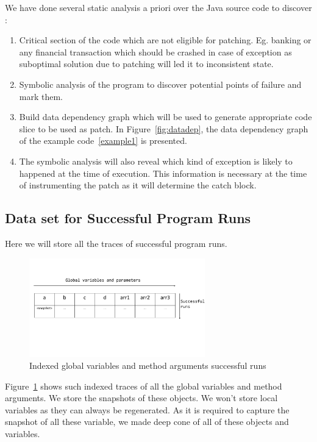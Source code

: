 \documentclass{sigplanconf}
\begin{document}
We have done several  static analysis a priori  over the Java source code to discover :
\begin{enumerate}
	\item Critical section of the code which are not eligible for patching. Eg. banking or any financial transaction which should be crashed in case of exception as suboptimal solution due to patching will led it to inconsistent state.
	\item Symbolic analysis of the program to discover potential points of failure and mark them.
	\item Build data dependency graph which will be used to generate appropriate code slice to be used as patch. In Figure~\ref{fig:datadep}, the data dependency graph of the example code~\ref{example1} is presented.
	\item The symbolic analysis will also reveal which kind of exception is likely to happened at the time of execution. This information is necessary at the time of instrumenting the patch as it will determine the catch block.
	
\end{enumerate}

\subsection{Data set for Successful Program Runs}
\label{subsec:progrun}

Here we will store all the traces of successful program runs.
\begin{figure}[!htb]
\centering
\includegraphics[width=3.0in]{images/succrun.pdf}
\caption{Indexed global variables and method arguments successful runs}
\label{fig:succrun}
\end{figure}

Figure~\ref{fig:succrun} shows such indexed traces of all the global variables and method arguments. We store the snapshots of these objects. We won't store local variables as they can always be regenerated. As it is required to capture the snapshot of all these variable, we made deep cone of all of these objects and variables. 
\end{document}
